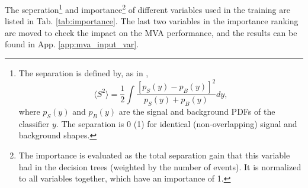 

The seperation\footnote{
The separation is defined by, as in \cite{BDT2},
\begin{equation}
\langle S^2 \rangle = \frac{1}{2} \int \frac{\left[p_S(y)-p_B(y)\right]^2}{p_S(y)+p_B(y)} dy,
\end{equation}
where $p_S(y)$ and $p_B(y)$ are the signal and background PDFs of the classifier $y$. The separation is 0 (1) for identical (non-overlapping) signal and background shapes.
} and importance\footnote{
The importance is evaluated as the total separation gain that this variable had in the decision trees (weighted by the number of events). It is normalized to all variables together, which have an importance of 1.
}
of different variables used in the training are listed in Tab. \ref{tab:importance}. The last two variables in the importance ranking are moved to check the impact on the MVA performance, and the results can be found in App. \ref{app:mva_input_var}. 






